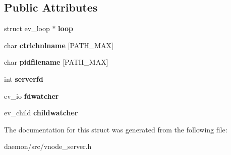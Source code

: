 \subsection*{Public Attributes}
\begin{DoxyCompactItemize}
\item 
\hypertarget{structvnode__server__t_a90ad991f2d66c523ac93c2db7a8f1613}{struct ev\+\_\+loop $\ast$ {\bfseries loop}}\label{structvnode__server__t_a90ad991f2d66c523ac93c2db7a8f1613}

\item 
\hypertarget{structvnode__server__t_a1a4eb86fca6a5375640038baf68ed970}{char {\bfseries ctrlchnlname} \mbox{[}P\+A\+T\+H\+\_\+\+M\+A\+X\mbox{]}}\label{structvnode__server__t_a1a4eb86fca6a5375640038baf68ed970}

\item 
\hypertarget{structvnode__server__t_a4664c2937b86e31056bdaf593bf34718}{char {\bfseries pidfilename} \mbox{[}P\+A\+T\+H\+\_\+\+M\+A\+X\mbox{]}}\label{structvnode__server__t_a4664c2937b86e31056bdaf593bf34718}

\item 
\hypertarget{structvnode__server__t_ae2282a33fbe0700e4bb6047867c1765c}{int {\bfseries serverfd}}\label{structvnode__server__t_ae2282a33fbe0700e4bb6047867c1765c}

\item 
\hypertarget{structvnode__server__t_ae7afbb8a20df80523731b90a03cf27f9}{ev\+\_\+io {\bfseries fdwatcher}}\label{structvnode__server__t_ae7afbb8a20df80523731b90a03cf27f9}

\item 
\hypertarget{structvnode__server__t_a1edd890b5b36c5284513d6b76976a7f6}{ev\+\_\+child {\bfseries childwatcher}}\label{structvnode__server__t_a1edd890b5b36c5284513d6b76976a7f6}

\end{DoxyCompactItemize}


The documentation for this struct was generated from the following file\+:\begin{DoxyCompactItemize}
\item 
daemon/src/vnode\+\_\+server.\+h\end{DoxyCompactItemize}
